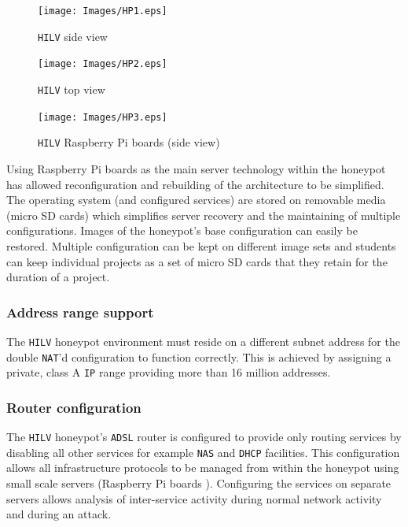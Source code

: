 \begin{figure}[!ht]
  \centering
  \begin{minipage}[h]{0.45\textwidth}
    \texttt{[image: Images/HP1.eps]}
    \caption{\texttt{HILV} side view}
    \label{fig:HP1}
  \end{minipage}
  \hfill
  \begin{minipage}[h]{0.45\textwidth}
    \texttt{[image: Images/HP2.eps]}
    \caption{\texttt{HILV} top view}
    \label{fig:HP2}
  \end{minipage}
\end{figure}

\begin{figure}[htb]
\begin{center}
	\texttt{[image: Images/HP3.eps]}
\caption{\texttt{HILV} Raspberry Pi boards (side view)}
\label{fig:HP3}
\end{center}
\end{figure}

Using Raspberry Pi boards as the main server technology within the honeypot has allowed reconfiguration and rebuilding of the architecture to be simplified. The operating system (and configured services) are stored on removable media (micro SD cards) which simplifies server recovery and the maintaining of multiple configurations. Images of the honeypot's base configuration can easily be restored. Multiple configuration can be kept on different image sets and students can keep individual projects as a set of micro SD cards that they retain for the duration of a project.

\subsubsection{Address range support}
The \texttt{HILV} honeypot environment must reside on a different subnet address for the double \texttt{NAT}'d configuration to function correctly. This is achieved by assigning a private, class A \texttt{IP} range providing more than 16 million addresses.

\subsubsection{Router configuration}
The \texttt{HILV} honeypot's \texttt{ADSL} router is configured to provide only routing services by disabling all other services for example \texttt{NAS} and \texttt{DHCP} facilities. This configuration allows all infrastructure protocols to be managed from within the honeypot using small scale servers (Raspberry Pi boards \cite{RASP:17}). Configuring the services on separate servers allows analysis of inter-service activity during normal network activity and during an attack.

